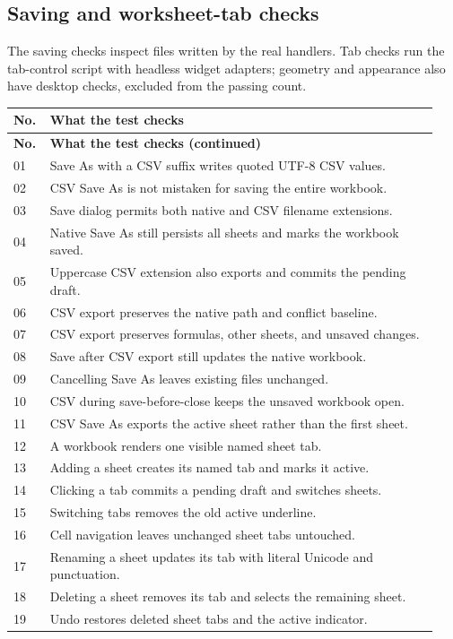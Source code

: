 \documentclass[11pt,letterpaper]{article}
\begin{document}
\subsection{Saving and worksheet-tab checks}
The saving checks inspect files written by the real handlers. Tab checks run
the tab-control script with headless widget adapters; geometry and appearance
also have desktop checks, excluded from the passing count.
\begin{longtable}{@{}P{0.07\linewidth}P{0.87\linewidth}@{}}
\toprule\textbf{No.} & \textbf{What the test checks}\\\midrule\endfirsthead
\toprule\textbf{No.} & \textbf{What the test checks (continued)}\\\midrule\endhead
01 & Save As with a CSV suffix writes quoted UTF-8 CSV values.\\
02 & CSV Save As is not mistaken for saving the entire workbook.\\
03 & Save dialog permits both native and CSV filename extensions.\\
04 & Native Save As still persists all sheets and marks the workbook saved.\\
05 & Uppercase CSV extension also exports and commits the pending draft.\\
06 & CSV export preserves the native path and conflict baseline.\\
07 & CSV export preserves formulas, other sheets, and unsaved changes.\\
08 & Save after CSV export still updates the native workbook.\\
09 & Cancelling Save As leaves existing files unchanged.\\
10 & CSV during save-before-close keeps the unsaved workbook open.\\
11 & CSV Save As exports the active sheet rather than the first sheet.\\
12 & A workbook renders one visible named sheet tab.\\
13 & Adding a sheet creates its named tab and marks it active.\\
14 & Clicking a tab commits a pending draft and switches sheets.\\
15 & Switching tabs removes the old active underline.\\
16 & Cell navigation leaves unchanged sheet tabs untouched.\\
17 & Renaming a sheet updates its tab with literal Unicode and punctuation.\\
18 & Deleting a sheet removes its tab and selects the remaining sheet.\\
19 & Undo restores deleted sheet tabs and the active indicator.\\
\bottomrule\end{longtable}
\end{document}
